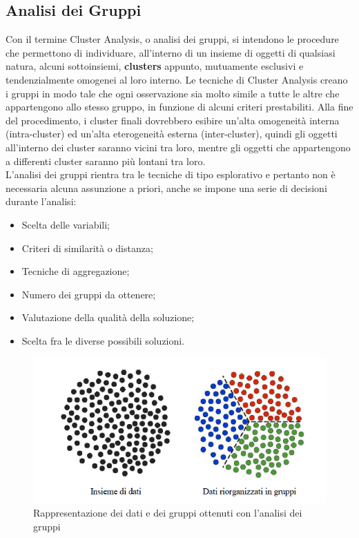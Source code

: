 \subsection{Analisi dei Gruppi}
Con il termine Cluster Analysis, o analisi dei gruppi, si intendono le procedure che permettono di individuare, all'interno di un insieme di oggetti di qualsiasi natura, alcuni sottoinsiemi, \textbf{clusters} appunto, mutuamente esclusivi e tendenzialmente omogenei al loro interno. Le tecniche di Cluster Analysis creano i gruppi in modo tale che ogni osservazione sia molto simile a tutte le altre che appartengono allo stesso gruppo, in funzione di alcuni criteri prestabiliti. Alla fine del procedimento, i cluster finali dovrebbero esibire un'alta omogeneità interna (intra-cluster) ed un'alta eterogeneità esterna (inter-cluster), quindi gli oggetti all'interno dei cluster saranno vicini tra loro, mentre gli oggetti che appartengono a differenti cluster saranno più lontani tra loro.\\
L'analisi dei gruppi rientra tra le tecniche di tipo esplorativo e pertanto non è necessaria alcuna assunzione a priori, anche se impone una serie di decisioni durante l'analisi:
\begin{itemize}
	\item Scelta delle variabili;
	\item Criteri di similarità o distanza;
	\item Tecniche di aggregazione;
	\item Numero dei gruppi da ottenere;
	\item Valutazione della qualità della soluzione;
	\item Scelta fra le diverse possibili soluzioni.
\end{itemize}
\begin{figure}[h!]
	\centering
	\includegraphics[width=1\textwidth]{images/Esempio_Cluster.png}
	\caption{Rappresentazione dei dati e dei gruppi ottenuti con l'analisi dei gruppi}
\end{figure}
